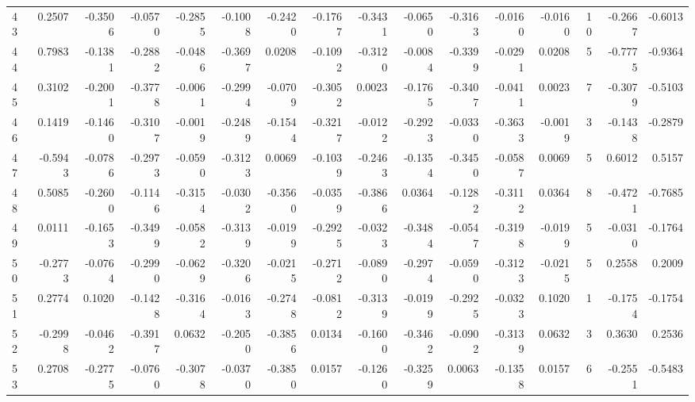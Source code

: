 \begin{tabular}{lrrrrrrrrrrrrrrr}
43  &      0.2507 & -0.3506 & -0.0570 & -0.2855 & -0.1008 & -0.2420 & -0.1767 & -0.3431 & -0.0650 & -0.3163 &  -0.0160 &    -0.0160 &     10 &                   -0.2667 &                    -0.6013 \\
44  &      0.7983 & -0.1381 & -0.2882 & -0.0486 & -0.3697 &  0.0208 & -0.1092 & -0.3120 & -0.0084 & -0.3399 &  -0.0291 &     0.0208 &      5 &                   -0.7775 &                    -0.9364 \\
45  &      0.3102 & -0.2001 & -0.3778 & -0.0061 & -0.2994 & -0.0709 & -0.3052 &  0.0023 & -0.1765 & -0.3407 &  -0.0411 &     0.0023 &      7 &                   -0.3079 &                    -0.5103 \\
46  &      0.1419 & -0.1460 & -0.3107 & -0.0019 & -0.2489 & -0.1544 & -0.3217 & -0.0122 & -0.2923 & -0.0330 &  -0.3633 &    -0.0019 &      3 &                   -0.1438 &                    -0.2879 \\
47  &     -0.5943 & -0.0786 & -0.2973 & -0.0590 & -0.3123 &  0.0069 & -0.1039 & -0.2463 & -0.1354 & -0.3450 &  -0.0587 &     0.0069 &      5 &                    0.6012 &                     0.5157 \\
48  &      0.5085 & -0.2600 & -0.1146 & -0.3154 & -0.0302 & -0.3560 & -0.0359 & -0.3866 &  0.0364 & -0.1282 &  -0.3112 &     0.0364 &      8 &                   -0.4721 &                    -0.7685 \\
49  &      0.0111 & -0.1653 & -0.3499 & -0.0582 & -0.3139 & -0.0199 & -0.2925 & -0.0323 & -0.3484 & -0.0547 &  -0.3198 &    -0.0199 &      5 &                   -0.0310 &                    -0.1764 \\
50  &     -0.2773 & -0.0764 & -0.2990 & -0.0629 & -0.3206 & -0.0215 & -0.2712 & -0.0890 & -0.2974 & -0.0590 &  -0.3123 &    -0.0215 &      5 &                    0.2558 &                     0.2009 \\
51  &      0.2774 &  0.1020 & -0.1428 & -0.3164 & -0.0163 & -0.2748 & -0.0812 & -0.3139 & -0.0199 & -0.2925 &  -0.0323 &     0.1020 &      1 &                   -0.1754 &                    -0.1754 \\
52  &     -0.2998 & -0.0462 & -0.3917 &  0.0632 & -0.2050 & -0.3856 &  0.0134 & -0.1600 & -0.3462 & -0.0902 &  -0.3139 &     0.0632 &      3 &                    0.3630 &                     0.2536 \\
53  &      0.2708 & -0.2775 & -0.0760 & -0.3078 & -0.0370 & -0.3850 &  0.0157 & -0.1260 & -0.3259 &  0.0063 &  -0.1358 &     0.0157 &      6 &                   -0.2551 &                    -0.5483 \\

\end{tabular}
